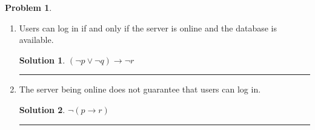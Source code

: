 \documentclass{article}
\theoremstyle{definition}
\newtheorem{problem}{Problem}
\def\fline{\rule{0.75\linewidth}{0.5pt}}
\newcommand{\finishline}{\begin{center}\fline\end{center}}
\newtheorem*{solution*}{Solution}
\newenvironment{solution}{\begin{solution*}}{{\finishline} \end{solution*}}
\begin{document}
\begin{problem}
\begin{enumerate}[label=\alph*)]
    \item Users can log in if and only if the server is online and
    the database is available.

    \begin{solution}

        $(\neg p \lor \neg q) \rightarrow \neg r$

    \end{solution}

    \item The server being online does not guarantee that users can log in.

    \begin{solution}

        $\neg(p \rightarrow r)$

    \end{solution}
\end{enumerate}
\end{problem}
\end{document}
